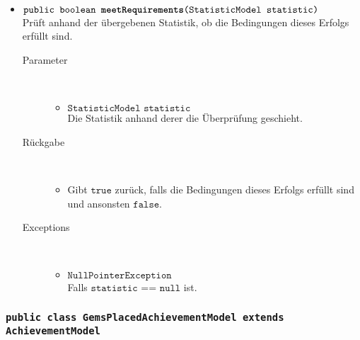 \begin{description}
\begin{itemize}
		\item $\texttt{public boolean \textbf{meetRequirements}(StatisticModel statistic)}$ \\ Prüft anhand der übergebenen Statistik, ob die Bedingungen dieses Erfolgs erfüllt sind.
		\begin{description}
		\item[Parameter] \hfill \\
			\vspace{-.8cm}
			\begin{itemize}
				\item $\texttt{StatisticModel statistic}$ \\ Die Statistik anhand derer die Überprüfung geschieht. 
			\end{itemize}
			\item[Rückgabe] \hfill \\
			\vspace{-.8cm}
			\begin{itemize}
				\item Gibt $\texttt{true}$ zurück, falls die Bedingungen dieses Erfolgs erfüllt sind und ansonsten $\texttt{false}$.
			\end{itemize}
			\item[Exceptions] \hfill \\
			\vspace{-.8cm}
			\begin{itemize}
				\item $\texttt{NullPointerException}$ \\ Falls $\texttt{statistic == null}$ ist.
			\end{itemize}
		\end{description}
		
	\end{itemize}
\end{description}

\subsubsection{\normalfont \texttt{public class \textbf{GemsPlacedAchievementModel} extends AchievementModel}}

